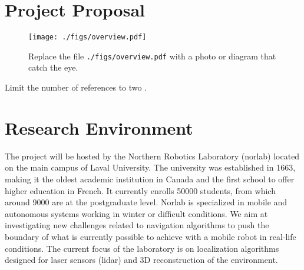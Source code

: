 \documentclass[10pt,letterpaper,oneside]{article}
\author{Fran\c{c}ois Pomerleau \\
       Laval University\\
       1065, av. de la Médecine \\
       Quebec, Qc \\
       Canada G1V 0A6 \\
       \texttt{<francois.pomerleau@ift.ulaval.ca>}
}
\begin{document}
\makeCustomTitle

\section*{Project Proposal}

\begin{wrapfigure}{R}{0.35\textwidth}
\centering
\texttt{[image: ./figs/overview.pdf]}
\caption{
Replace the file \texttt{./figs/overview.pdf} with a photo or diagram that catch the eye.
}
\label{fig:overview}
\end{wrapfigure}

Limit the number of references to two \cite{Pomerleau2013,Pomerleau2014}.
\lipsum[1-2]

\section*{Research Environment}

The project will be hosted by the Northern Robotics Laboratory (norlab) located on the main campus of Laval University.
The university was established in \num{1663}, making it the oldest academic institution in Canada and the first school to offer higher education in French.
It currently enrolls \num{50000} students, from which around \num{9000} are at the postgraduate level.
Norlab is specialized in mobile and autonomous systems working in winter or difficult conditions. 
We aim at investigating new challenges related to navigation algorithms to push the boundary of what is currently possible to achieve with a mobile robot in real-life conditions. 
The current focus of the laboratory is on localization algorithms designed for laser sensors (lidar) and 3D reconstruction of the environment.

\printbibliography
\end{document}
